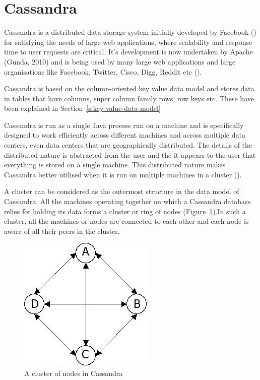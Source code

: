 \section{Cassandra} \label{s:Cassandra}

Cassandra is a distributed data storage system initially developed by Facebook
() for satisfying the needs of large web applications, where
scalability and response time to user requests are critical. It's development is
now undertaken by Apache (Gunda, 2010) and is being used by many large web
applications and large organisations like Facebook, Twitter, Cisco, Digg, Reddit
etc (). 

Cassandra is based on the column-oriented key value data model and stores data
in tables that have columns, super column family rows, row keys etc.
These have been explained in Section~\ref{s:key-value-data-model}

Cassandra is run as a single Java process run on a machine and is specifically
designed to work efficiently across different machines and across multiple data
centers, even data centers that are geographically distributed. The details of
the distributed nature is abstracted from  the user and the it appears to the
user that everything is stored on a single machine. This distributed nature
makes Cassandra better utilised when it is run on multiple machines in a cluster
().

A cluster can be considered as the outermost structure in the data model
of Cassandra. All the machines operating together on which a Cassandra database
relies for holding its data  forms a cluster or ring of nodes
(Figure~\ref{f:cluster}).In such a cluster, all the machines or nodes are
connected to each other and each node is aware of all their peers in the
cluster.

\begin{figure}[h]
	\centering
	\includegraphics[width=.3\textwidth]{./figure/Solutions/Cassandra-cluster.png}
	\caption{A cluster of nodes in Cassandra}\label{f:cluster}
\end{figure}

